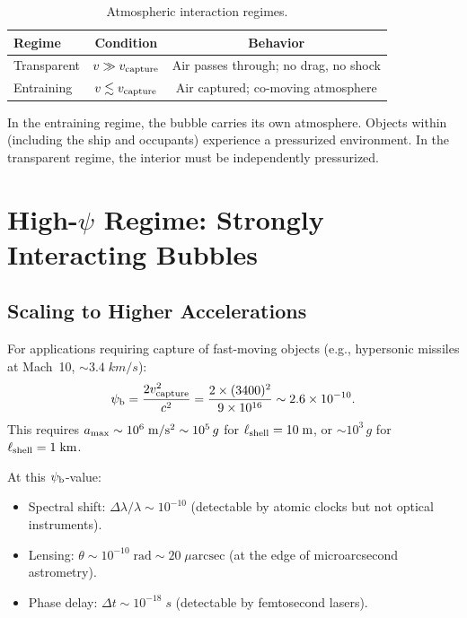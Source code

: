 \documentclass[12pt,aps,prd,superscriptaddress,nofootinbib]{revtex4-2}
\newcommand{\psib}{\psi_{\rm b}}
\newcommand{\Lshell}{\ell_{\rm shell}}
\begin{document}
\begin{table}[h]
\caption{Atmospheric interaction regimes.}
\begin{ruledtabular}
\begin{tabular}{lcc}
Regime & Condition & Behavior \\
\hline
Transparent & $v \gg v_{\rm capture}$ &
  Air passes through; no drag, no shock \\
Entraining & $v \lesssim v_{\rm capture}$ &
  Air captured; co-moving atmosphere \\
\end{tabular}
\end{ruledtabular}
\end{table}

In the entraining regime, the bubble carries its own atmosphere.
Objects within (including the ship and occupants) experience a
pressurized environment. In the transparent regime, the interior
must be independently pressurized.


\section{High-$\psi$ Regime: Strongly Interacting Bubbles}\label{sec:high-psi}

\subsection{Scaling to Higher Accelerations}

For applications requiring capture of fast-moving objects
(e.g., hypersonic missiles at Mach~10, $\sim 3.4\;\si{km/s}$):
\begin{equation}
\psib = \frac{2v_{\rm capture}^2}{c^2}
= \frac{2\times (3400)^2}{9\times 10^{16}}
\sim 2.6\times 10^{-10}.
\end{equation}
This requires $a_{\rm max} \sim 10^6\;\si{m/s^2} \sim 10^5\,g$
for $\Lshell = 10\;\si{m}$, or $\sim 10^3\,g$ for
$\Lshell = 1\;\si{km}$.

At this $\psib$-value:
\begin{itemize}
\item Spectral shift: $\Delta\lambda/\lambda \sim 10^{-10}$
  (detectable by atomic clocks but not optical instruments).
\item Lensing: $\theta \sim 10^{-10}\;\text{rad}
  \sim 20\;\mu\text{arcsec}$ (at the edge of microarcsecond
  astrometry).
\item Phase delay: $\Delta t \sim 10^{-18}\;\si{s}$
  (detectable by femtosecond lasers).
\end{itemize}
\end{document}
